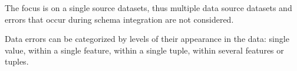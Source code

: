 The focus is on a single source datasets, thus multiple data source datasets and errors that occur during schema integration are not considered.


Data errors can be categorized by levels of their appearance in the data: single value, within a single feature, within a single tuple, within several features or tuples.



